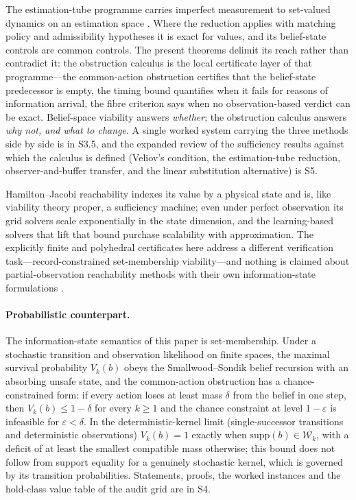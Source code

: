 \documentclass[11pt,a4paper]{article}
\theoremstyle{plain}
\theoremstyle{definition}
\theoremstyle{remark}
\newcommand{\cW}{\mathcal{W}}
\newcommand{\supp}{\mathrm{supp}}
\begin{document}
The estimation-tube programme carries imperfect measurement to set-valued dynamics on an estimation space \citep{kurzhanski1997,cardaliaguet2007}. Where the reduction applies with matching policy and admissibility hypotheses it is exact for values, and its belief-state controls are common controls. The present theorems delimit its reach rather than contradict it: the obstruction calculus is the local certificate layer of that programme---the common-action obstruction certifies that the belief-state predecessor is empty, the timing bound quantifies when it fails for reasons of information arrival, the fibre criterion says when no observation-based verdict can be exact. Belief-space viability answers \emph{whether}; the obstruction calculus answers \emph{why not, and what to change}. A single worked system carrying the three methods side by side is in S3.5, and the expanded review of the sufficiency results against which the calculus is defined (Veliov's condition, the estimation-tube reduction, observer-and-buffer transfer, and the linear substitution alternative) is S5.

Hamilton--Jacobi reachability \citep{mitchell2005,margellos2011,bansal2017} indexes its value by a physical state and is, like viability theory proper, a sufficiency machine; even under perfect observation its grid solvers scale exponentially in the state dimension, and the learning-based solvers that lift that bound \citep{bansal2021} purchase scalability with approximation. The explicitly finite and polyhedral certificates here address a different verification task---record-constrained set-membership viability---and nothing is claimed about partial-observation reachability methods with their own information-state formulations \citep{chatterjee2009}.

\paragraph{Probabilistic counterpart.} The information-state semantics of this paper is set-membership. Under a stochastic transition and observation likelihood on finite spaces, the maximal survival probability $V_k(b)$ obeys the Smallwood--Sondik belief recursion with an absorbing unsafe state, and the common-action obstruction has a chance-constrained form: if every action loses at least mass $\delta$ from the belief in one step, then $V_k(b)\le1-\delta$ for every $k\ge1$ and the chance constraint at level $1-\varepsilon$ is infeasible for $\varepsilon<\delta$. In the deterministic-kernel limit (single-successor transitions and deterministic observations) $V_k(b)=1$ exactly when $\supp(b)\in\cW_k$, with a deficit of at least the smallest compatible mass otherwise; this bound does not follow from support equality for a genuinely stochastic kernel, which is governed by its transition probabilities. Statements, proofs, the worked instances and the hold-class value table of the audit grid are in S4.
\end{document}
